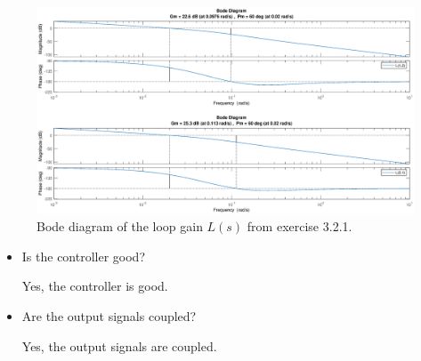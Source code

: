 \documentclass[11pt,a4paper]{article}
\begin{document}
\begin{figure}[!ht]
	\footnotesize
	\centering 
	\includegraphics[width=\textwidth]{331}
	\caption{Bode diagram of the loop gain $L(s)$ from exercise 3.2.1.}
	\label{fig:NMPBodeL}
\end{figure}
\begin{itemize}
\item Is the controller good?
\par Yes, the controller is good.

\item Are the output signals coupled?
\par Yes, the output signals are coupled.
\end{itemize}
\end{document}
